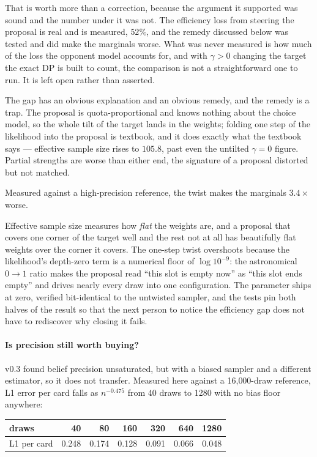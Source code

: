 \documentclass[11pt,letterpaper]{article}
\begin{document}
That is worth more than a correction, because the argument it supported was
sound and the number under it was not. The efficiency loss from steering the
proposal is real and is measured, $52\%$, and the remedy discussed below
was tested and did make the marginals worse. What was never measured is how
much of the loss the opponent model accounts for, and with $\gamma > 0$ changing
the target the exact DP is built to count, the comparison is not a
straightforward one to run. It is left open rather than asserted.

The gap has an obvious explanation and an obvious remedy, and the remedy is a
trap. The proposal is quota-proportional and knows nothing about the choice
model, so the whole tilt of the target lands in the weights; folding one step of
the likelihood into the proposal is textbook, and it does exactly what the
textbook says --- effective sample size rises to $105.8$, past even the untilted
$\gamma = 0$ figure. Partial strengths are worse than either end, the signature
of a proposal distorted but not matched.

Measured against a high-precision reference, the twist makes the marginals
$3.4\times$ worse.

Effective sample size measures how \emph{flat} the weights are, and a proposal
that covers one corner of the target well and the rest not at all has beautifully
flat weights over the corner it covers. The one-step twist overshoots because the
likelihood's depth-zero term is a numerical floor of $\log 10^{-9}$: the
astronomical $0 \to 1$ ratio makes the proposal read ``this slot is empty now''
as ``this slot ends empty'' and drives nearly every draw into one configuration.
The parameter ships at zero, verified bit-identical to the untwisted sampler, and
the tests pin both halves of the result so that the next person to notice the
efficiency gap does not have to rediscover why closing it fails.

\paragraph{Is precision still worth buying?} v0.3 found belief precision
unsaturated, but with a biased sampler and a different estimator, so it does not
transfer. Measured here against a 16{,}000-draw reference, L1 error per card falls
as $n^{-0.475}$ from 40 draws to 1280 with no bias floor anywhere:

\begin{center}
\small
\begin{tabular}{lrrrrrr}
\toprule
draws & 40 & 80 & 160 & 320 & 640 & 1280 \\
\midrule
L1 per card & 0.248 & 0.174 & 0.128 & 0.091 & 0.066 & 0.048 \\
\bottomrule
\end{tabular}
\end{center}
\end{document}
